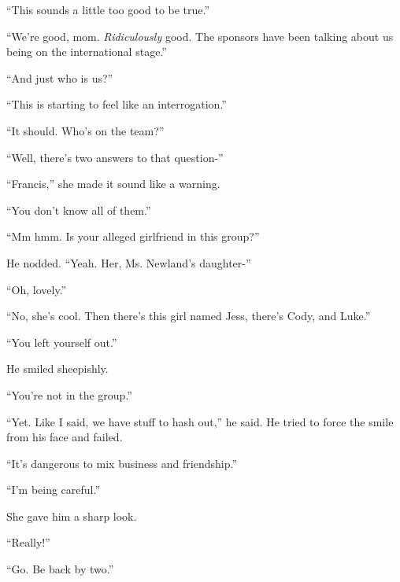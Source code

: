 ``This sounds a little too good to be true.''



``We're good, mom.  \emph{Ridiculously} good.  The sponsors have been talking about us being on the international stage.''



``And just who is us?''



``This is starting to feel like an interrogation.''



``It should.  Who's on the team?''



``Well, there's two answers to that question-''



``Francis,'' she made it sound like a warning.



``You don't know all of them.''



``Mm hmm.  Is your alleged girlfriend in this group?''



He nodded.  ``Yeah.  Her, Ms. Newland's daughter-''



``Oh, lovely.''



``No, she's cool.  Then there's this girl named Jess, there's Cody, and Luke.''



``You left yourself out.''



He smiled sheepishly.



``You're not in the group.''



``Yet.  Like I said, we have stuff to hash out,'' he said.  He tried to force the smile from his face and failed.



``It's dangerous to mix business and friendship.''



``I'm being careful.''



She gave him a sharp look.



``Really!''



``Go.  Be back by two.''



